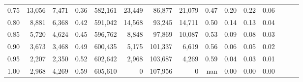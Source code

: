 \begin{tabular}{rrrrrrrrrrrrrrr}
0.75 &  13,056 &   7,471 &  0.36 &  582,161 &   23,449 &   86,877 &   21,079 &  0.47 &  0.20 &  0.22 &      0.06 \\
0.80 &   8,881 &   6,368 &  0.42 &  591,042 &   14,568 &   93,245 &   14,711 &  0.50 &  0.14 &  0.13 &      0.04 \\
0.85 &   5,720 &   4,624 &  0.45 &  596,762 &    8,848 &   97,869 &   10,087 &  0.53 &  0.09 &  0.08 &      0.03 \\
0.90 &   3,673 &   3,468 &  0.49 &  600,435 &    5,175 &  101,337 &    6,619 &  0.56 &  0.06 &  0.05 &      0.02 \\
0.95 &   2,207 &   2,350 &  0.52 &  602,642 &    2,968 &  103,687 &    4,269 &  0.59 &  0.04 &  0.03 &      0.01 \\
1.00 &   2,968 &   4,269 &  0.59 &  605,610 &        0 &  107,956 &        0 &   nan &  0.00 &  0.00 &      0.00 \\
\bottomrule
\end{tabular}
